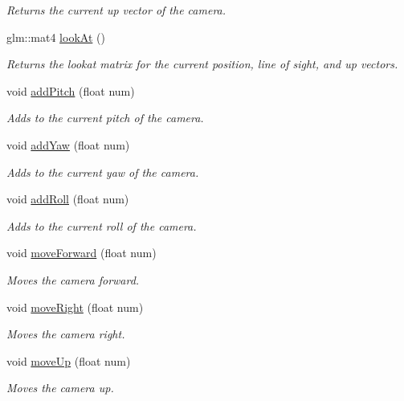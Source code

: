 \begin{DoxyCompactItemize}
\begin{DoxyCompactList}\small\item\em Returns the current up vector of the camera. \end{DoxyCompactList}\item 
glm\+::mat4 \hyperlink{class_y_p_r_camera_a6312430157dfe879afee0af5f7759a87}{look\+At} ()
\begin{DoxyCompactList}\small\item\em Returns the lookat matrix for the current position, line of sight, and up vectors. \end{DoxyCompactList}\item 
void \hyperlink{class_y_p_r_camera_ac301ce5ca1503a73cce5aa7a700c62e2}{add\+Pitch} (float num)
\begin{DoxyCompactList}\small\item\em Adds to the current pitch of the camera. \end{DoxyCompactList}\item 
void \hyperlink{class_y_p_r_camera_abca416bb77e38db7526e54e139153554}{add\+Yaw} (float num)
\begin{DoxyCompactList}\small\item\em Adds to the current yaw of the camera. \end{DoxyCompactList}\item 
void \hyperlink{class_y_p_r_camera_a40cd825b06e9d3b361bd3cf7c05d7b2a}{add\+Roll} (float num)
\begin{DoxyCompactList}\small\item\em Adds to the current roll of the camera. \end{DoxyCompactList}\item 
void \hyperlink{class_y_p_r_camera_a3fa6a8dba8cea84cabb9155b030d849e}{move\+Forward} (float num)
\begin{DoxyCompactList}\small\item\em Moves the camera forward. \end{DoxyCompactList}\item 
void \hyperlink{class_y_p_r_camera_a477ddad236b2b2d6cb2c8a7ae60cfa53}{move\+Right} (float num)
\begin{DoxyCompactList}\small\item\em Moves the camera right. \end{DoxyCompactList}\item 
void \hyperlink{class_y_p_r_camera_a37f3668e2f09ec2f7004d016844b468e}{move\+Up} (float num)
\begin{DoxyCompactList}\small\item\em Moves the camera up. \end{DoxyCompactList}\item 

\end{DoxyCompactItemize}
